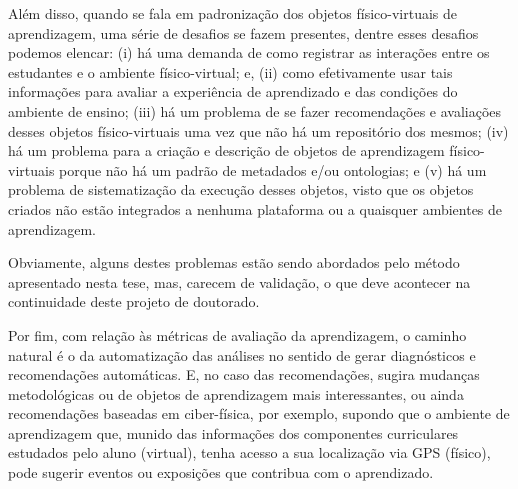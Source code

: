 Além disso, quando se fala em padronização dos objetos físico-virtuais de aprendizagem, uma série de desafios se fazem presentes, dentre esses desafios podemos elencar: (i) há uma demanda de como registrar as interações entre os estudantes e o ambiente físico-virtual; e, (ii) como efetivamente usar tais informações para avaliar a experiência de aprendizado e das condições do ambiente de ensino; (iii) há um problema de se fazer recomendações e avaliações desses objetos físico-virtuais uma vez que não há um repositório dos mesmos; (iv) há um problema para a criação e descrição de objetos de aprendizagem físico-virtuais porque não há um padrão de metadados e/ou ontologias; e (v) há um problema de sistematização da execução desses objetos, visto que os objetos criados não estão integrados a nenhuma plataforma ou a quaisquer ambientes de aprendizagem.

Obviamente, alguns destes problemas estão sendo abordados pelo método apresentado nesta tese, mas, carecem de validação, o que deve acontecer na continuidade deste projeto de doutorado.

Por fim, com relação às métricas de avaliação da aprendizagem, o caminho natural é o da automatização das análises no sentido de gerar diagnósticos e recomendações automáticas. E, no caso das recomendações, sugira mudanças metodológicas ou de objetos de aprendizagem mais interessantes, ou ainda recomendações baseadas em ciber-física, por exemplo, supondo que o ambiente de aprendizagem que, munido das informações dos componentes curriculares estudados pelo aluno (virtual), tenha acesso a sua localização via GPS (físico), pode sugerir eventos ou exposições que contribua com o aprendizado.